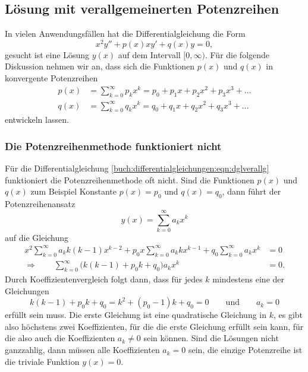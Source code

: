 %
%
\subsection{Lösung mit verallgemeinerten Potenzreihen
\label{buch:differentialgleichungen:subsection:verallgemeinrt}}
In vielen Anwendungsfällen hat die Differentialgleichung die Form
\begin{equation}
x^2y'' + p(x)xy' + q(x)y = 0,
\label{buch:differentialgleichungen:eqn:dglverallg}
\end{equation}
gesucht ist eine Lösung $y(x)$ auf dem Intervall $[0,\infty)$.
Für die folgende Diskussion nehmen wir an, dass sich die Funktionen
$p(x)$ und $q(x)$ in konvergente Potenzreihen
\begin{align*}
p(x)&=\sum_{k=0}^\infty p_kx^k = p_0+p_1x+p_2x^2+p_3x^3+\dots
\\
q(x)&=\sum_{k=0}^\infty q_kx^k = q_0+q_1x+q_2x^2+q_3x^3+\dots
\end{align*}
entwickeln lassen.
%
%

%
%
\subsubsection{Die Potenzreihenmethode funktioniert nicht}
Für die Differentialgleichung
\eqref{buch:differentialgleichungen:eqn:dglverallg}
funktioniert die Potenzreihenmethode oft nicht.
Sind die Funktionen $p(x)$ und $q(x)$ zum Beispiel Konstante 
$p(x)=p_0$ und $q(x)=q_0$, dann führt der Potenzreihenansatz
\[
y(x) = \sum_{k=0}^\infty a_kx^k
\]
auf die Gleichung
\begin{align*}
x^2\sum_{k=0}^\infty a_kk(k-1)x^{k-2}
+
p_0x\sum_{k=0}^\infty a_kkx^{k-1}
+
q_0\sum_{k=0}^\infty a_kx^k
&=
0
\\
\Rightarrow\qquad
\sum_{k=0}^\infty\bigl(
k(k-1)
+
p_0k
+
q_0
\bigr)a_kx^k
&=
0.
\end{align*}
Durch Koeffizientenvergleich folgt dann, dass für jedes $k$ mindestens
eine der Gleichungen
\[
k(k-1) +p_0k +q_0 = k^2 + (p_0-1)k +q_0 = 0
\qquad\text{und}\qquad
a_k=0
\]
erfüllt sein muss.
Die erste Gleichung ist eine quadratische Gleichung in $k$, es gibt also
höchstens zwei Koeffizienten, für die die erste Gleichung erfüllt sein
kann, für die also auch die Koeffizienten $a_k\ne 0$ sein können.
Sind die Lösungen nicht ganzzahlig, dann müssen alle Koeffizienten 
$a_k=0$ sein, die einzige Potenzreihe ist die triviale Funktion $y(x)=0$.

